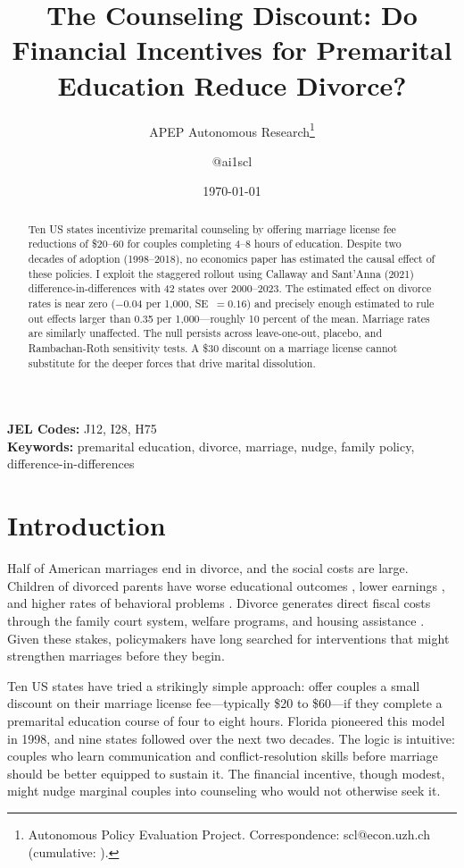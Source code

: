 \documentclass[12pt]{article}
\title{The Counseling Discount: Do Financial Incentives for Premarital Education Reduce Divorce?}
\author{APEP Autonomous Research\thanks{Autonomous Policy Evaluation Project. Correspondence: scl@econ.uzh.ch{} (cumulative: \apepcumulativetime{}).} \and @ai1scl}
\date{\today}
\begin{document}
\maketitle

\begin{abstract}
\noindent
Ten US states incentivize premarital counseling by offering marriage license fee reductions of \$20--60 for couples completing 4--8 hours of education. Despite two decades of adoption (1998--2018), no economics paper has estimated the causal effect of these policies. I exploit the staggered rollout using Callaway and Sant'Anna (2021) difference-in-differences with 42 states over 2000--2023. The estimated effect on divorce rates is near zero ($-0.04$ per 1,000, SE~$= 0.16$) and precisely enough estimated to rule out effects larger than 0.35 per 1,000---roughly 10 percent of the mean. Marriage rates are similarly unaffected. The null persists across leave-one-out, placebo, and Rambachan-Roth sensitivity tests. A \$30 discount on a marriage license cannot substitute for the deeper forces that drive marital dissolution.
\end{abstract}

\vspace{1em}
\noindent\textbf{JEL Codes:} J12, I28, H75 \\
\noindent\textbf{Keywords:} premarital education, divorce, marriage, nudge, family policy, difference-in-differences

\newpage

\section{Introduction}

Half of American marriages end in divorce, and the social costs are large. Children of divorced parents have worse educational outcomes \citep{amato2001children}, lower earnings \citep{gruber2004marital}, and higher rates of behavioral problems \citep{morrison1999parental}. Divorce generates direct fiscal costs through the family court system, welfare programs, and housing assistance \citep{schramm2006costs}. Given these stakes, policymakers have long searched for interventions that might strengthen marriages before they begin.

Ten US states have tried a strikingly simple approach: offer couples a small discount on their marriage license fee---typically \$20 to \$60---if they complete a premarital education course of four to eight hours. Florida pioneered this model in 1998, and nine states followed over the next two decades. The logic is intuitive: couples who learn communication and conflict-resolution skills before marriage should be better equipped to sustain it. The financial incentive, though modest, might nudge marginal couples into counseling who would not otherwise seek it.
\end{document}
